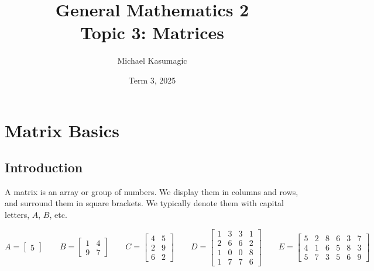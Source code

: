 \documentclass[12pt]{report}
\title{\Huge{General Mathematics 2}\\Topic 3: Matrices}
\author{\huge{Michael Kasumagic}}
\date{\huge{Term 3, 2025}}
\begin{document}
\maketitle
\newpage%
\tableofcontents
\pagebreak

\chapter{Matrix Basics}
\section{Introduction}
A matrix is an array or group of numbers. We display them in columns and rows, and surround them in square brackets. We typically denote them with capital letters, $A$, $B$, etc. 

\begin{equation}
	A = \begin{bmatrix} 5 \end{bmatrix} \qquad
	B = \begin{bmatrix} 1 & 4 \\ 9 & 7 \end{bmatrix} \qquad
	C = \begin{bmatrix} 4 & 5 \\ 2 & 9 \\ 6 & 2	\end{bmatrix} \qquad
	D = \begin{bmatrix} 1 & 3 & 3 & 1 \\ 2 & 6 & 6 & 2 \\ 1 & 0 & 0 & 8 \\ 1 & 7 & 7 & 6	\end{bmatrix} \qquad
	E = \begin{bmatrix} 5 & 2 & 8 & 6 & 3 & 7 \\ 4 & 1 & 6 & 5 & 8 & 3 \\ 5 & 7 & 3 & 5 & 6 & 9	\end{bmatrix}
	\label{eq:MatrixSizeExamples}
\end{equation}
\end{document}

